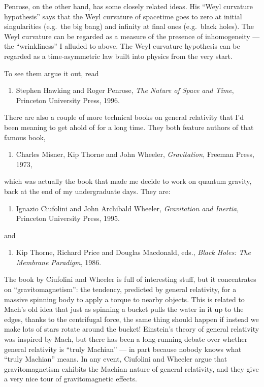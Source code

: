 \documentclass{article}
\def\tightlist{}
\begin{document}
Penrose, on the other hand, has some closely related ideas. His ``Weyl
curvature hypothesis'' says that the Weyl curvature of spacetime goes to
zero at initial singularities (e.g.~the big bang) and infinity at final
ones (e.g.~black holes). The Weyl curvature can be regarded as a measure
of the presence of inhomogeneity --- the ``wrinkliness'' I alluded to
above. The Weyl curvature hypothesis can be regarded as a
time-asymmetric law built into physics from the very start.

To see them argue it out, read

\begin{enumerate}
\def\labelenumi{\arabic{enumi})}
\setcounter{enumi}{1}
\tightlist
\item
  Stephen Hawking and Roger Penrose, \emph{The Nature of Space and
  Time}, Princeton University Press, 1996.
\end{enumerate}

There are also a couple of more technical books on general relativity
that I'd been meaning to get ahold of for a long time. They both feature
authors of that famous book,

\begin{enumerate}
\def\labelenumi{\arabic{enumi})}
\setcounter{enumi}{2}
\tightlist
\item
  Charles Misner, Kip Thorne and John Wheeler, \emph{Gravitation},
  Freeman Press, 1973,
\end{enumerate}

which was actually the book that made me decide to work on quantum
gravity, back at the end of my undergraduate days. They are:

\begin{enumerate}
\def\labelenumi{\arabic{enumi})}
\setcounter{enumi}{3}
\tightlist
\item
  Ignazio Ciufolini and John Archibald Wheeler, \emph{Gravitation and
  Inertia}, Princeton University Press, 1995.
\end{enumerate}

and

\begin{enumerate}
\def\labelenumi{\arabic{enumi})}
\setcounter{enumi}{4}
\tightlist
\item
  Kip Thorne, Richard Price and Douglas Macdonald, eds., \emph{Black
  Holes: The Membrane Paradigm}, 1986.
\end{enumerate}

The book by Ciufolini and Wheeler is full of interesting stuff, but it
concentrates on ``gravitomagnetism'': the tendency, predicted by general
relativity, for a massive spinning body to apply a torque to nearby
objects. This is related to Mach's old idea that just as spinning a
bucket pulls the water in it up to the edges, thanks to the centrifugal
force, the same thing should happen if instead we make lots of stars
rotate around the bucket! Einstein's theory of general relativity was
inspired by Mach, but there has been a long-running debate over whether
general relativity is ``truly Machian'' --- in part because nobody knows
what ``truly Machian'' means. In any event, Ciufolini and Wheeler argue
that gravitomagnetism exhibits the Machian nature of general relativity,
and they give a very nice tour of gravitomagnetic effects.
\end{document}
